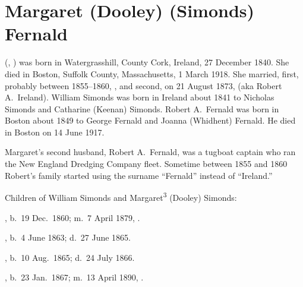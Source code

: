 \section{Margaret (Dooley) (Simonds) Fernald}

 (, ) was born in Watergrasshill, County Cork, Ireland, 27 December 1840.\cite{Margaret3DooleyBaptism} She died in Boston, Suffolk County, Massachusetts, 1 March 1918.\cite{Margaret3DooleyDeath} She married, first, probably between 1855--1860, ,\cite{WilliamSimondsMarriage} and second, on 21 August 1873, \cite{RobertFernaldMarriage} (aka Robert A.\ Ireland).\cite{Census1855RobertFernald} William Simonds was born in Ireland about 1841\cite{Census1855WilliamSimonds} to Nicholas Simonds and Catharine (Keenan) Simonds.\cite{WilliamSimondsDeath,CatharineSimondsDeath} Robert A.\ Fernald was born in Boston about 1849 to George Fernald and Joanna (Whidhent) Fernald.\cite{RobertFernaldMarriage,JoannaFernaldDeath} He died in Boston on 14 June 1917.\cite{RobertFernaldDeath}

Margaret's second husband, Robert A.\ Fernald, was a tugboat captain who ran the New England Dredging Company fleet.\cite{RobertFernaldDeath} Sometime between 1855 and 1860 Robert's family started using the surname ``Fernald'' instead of ``Ireland.''\cite{Census1855RobertFernald,Census1860RobertFernald}

\begin{KidsIntro}
	Children of William Simonds and Margaret\textsuperscript{3} (Dooley) Simonds:
\end{KidsIntro}

\begin{Kids}
	
	, b.\ 19 Dec.\ 1860; m.\ 7 April 1879, .
	
	, b.\ 4 June 1863;\cite{Francis4SimondsBirth} d.\ 27 June 1865.\cite{Francis4SimondsDeath}
	
	, b.\ 10 Aug.\ 1865;\cite{Margaret4SimondsBirth} d.\ 24 July 1866.\cite{Margaret4SimondsDeath}
	
	, b.\ 23 Jan.\ 1867; m.\ 13 April 1890, .

\end{Kids}
	
